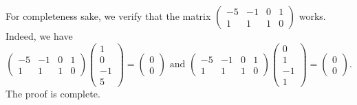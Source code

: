 \documentclass{article}
\begin{document}
\begin{enumerate}[(a)]
    For completeness sake, we verify that the matrix $\begin{pmatrix}-5&-1&0&1\\1&1&1&0\end{pmatrix}$ works. Indeed, we have
    $$\begin{pmatrix}-5&-1&0&1\\1&1&1&0\end{pmatrix}\begin{pmatrix}1\\0\\-1\\5\end{pmatrix}=\begin{pmatrix}0\\0\end{pmatrix}\text{ and }\begin{pmatrix}-5&-1&0&1\\1&1&1&0\end{pmatrix}\begin{pmatrix}0\\1\\-1\\1\end{pmatrix}=\begin{pmatrix}0\\0\end{pmatrix}.$$
    The proof is complete.
\end{enumerate}
\end{document}
